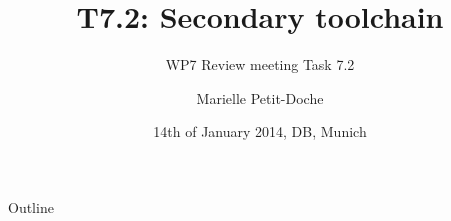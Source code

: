 \documentclass{beamer}
\title[Decision meeting T7.2] %
{T7.2: Secondary toolchain}
\subtitle
{WP7 Review meeting Task 7.2}
\author[WP7 - Task 7.2] %
{Marielle Petit-Doche}
\institute[Universities of Somewhere and Elsewhere] %
{\pgfdeclareimage[height=1cm]{systerel-logo}{logoSysterel}
 \pgfuseimage{systerel-logo}
 }
\date[14th of January, Munich] %
{14th of January 2014, DB, Munich}
\begin{document}
\begin{frame}
  \titlepage
\end{frame}

\begin{frame}{Outline}
  \tableofcontents
\end{frame}
























%
\end{document}
